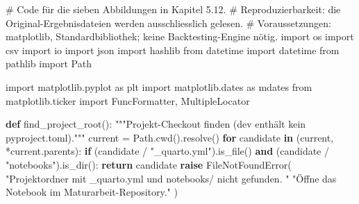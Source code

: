 \documentclass[
  ngerman,
  a4paper,
  DIV=11,
  oneside]{scrreprt}
\newenvironment{Shaded}{\begin{snugshade}}{\end{snugshade}}
\newcommand{\CommentTok}[1]{\textcolor[rgb]{0.37,0.37,0.37}{#1}}
\newcommand{\ControlFlowTok}[1]{\textcolor[rgb]{0.00,0.23,0.31}{\textbf{#1}}}
\newcommand{\ImportTok}[1]{\textcolor[rgb]{0.00,0.46,0.62}{#1}}
\newcommand{\KeywordTok}[1]{\textcolor[rgb]{0.00,0.23,0.31}{\textbf{#1}}}
\newcommand{\NormalTok}[1]{\textcolor[rgb]{0.00,0.23,0.31}{#1}}
\newcommand{\OperatorTok}[1]{\textcolor[rgb]{0.37,0.37,0.37}{#1}}
\newcommand{\PreprocessorTok}[1]{\textcolor[rgb]{0.68,0.00,0.00}{#1}}
\newcommand{\StringTok}[1]{\textcolor[rgb]{0.13,0.47,0.30}{#1}}
\begin{document}
\begin{Shaded}
\begin{Highlighting}[]
\CommentTok{\# Code für die sieben Abbildungen in Kapitel 5.12.}
\CommentTok{\# Reproduzierbarkeit: die Original{-}Ergebnisdateien werden ausschliesslich gelesen.}
\CommentTok{\# Voraussetzungen: matplotlib, Standardbibliothek; keine Backtesting{-}Engine nötig.}
\ImportTok{import}\NormalTok{ os}
\ImportTok{import}\NormalTok{ csv}
\ImportTok{import}\NormalTok{ io}
\ImportTok{import}\NormalTok{ json}
\ImportTok{import}\NormalTok{ hashlib}
\ImportTok{from}\NormalTok{ datetime }\ImportTok{import}\NormalTok{ datetime}
\ImportTok{from}\NormalTok{ pathlib }\ImportTok{import}\NormalTok{ Path}

\ImportTok{import}\NormalTok{ matplotlib.pyplot }\ImportTok{as}\NormalTok{ plt}
\ImportTok{import}\NormalTok{ matplotlib.dates }\ImportTok{as}\NormalTok{ mdates}
\ImportTok{from}\NormalTok{ matplotlib.ticker }\ImportTok{import}\NormalTok{ FuncFormatter, MultipleLocator}

\KeywordTok{def}\NormalTok{ find\_project\_root():}
    \CommentTok{"""Projekt{-}Checkout finden (dev enthält kein pyproject.toml)."""}
\NormalTok{    current }\OperatorTok{=}\NormalTok{ Path.cwd().resolve()}
    \ControlFlowTok{for}\NormalTok{ candidate }\KeywordTok{in}\NormalTok{ (current, }\OperatorTok{*}\NormalTok{current.parents):}
        \ControlFlowTok{if}\NormalTok{ (candidate }\OperatorTok{/} \StringTok{"\_quarto.yml"}\NormalTok{).is\_file() }\KeywordTok{and}\NormalTok{ (candidate }\OperatorTok{/} \StringTok{"notebooks"}\NormalTok{).is\_dir():}
            \ControlFlowTok{return}\NormalTok{ candidate}
    \ControlFlowTok{raise} \PreprocessorTok{FileNotFoundError}\NormalTok{(}
        \StringTok{"Projektordner mit \_quarto.yml und notebooks/ nicht gefunden. "}
        \StringTok{"Öffne das Notebook im Maturarbeit{-}Repository."}
\NormalTok{    )}



\end{Highlighting}
\end{Shaded}
\end{document}

